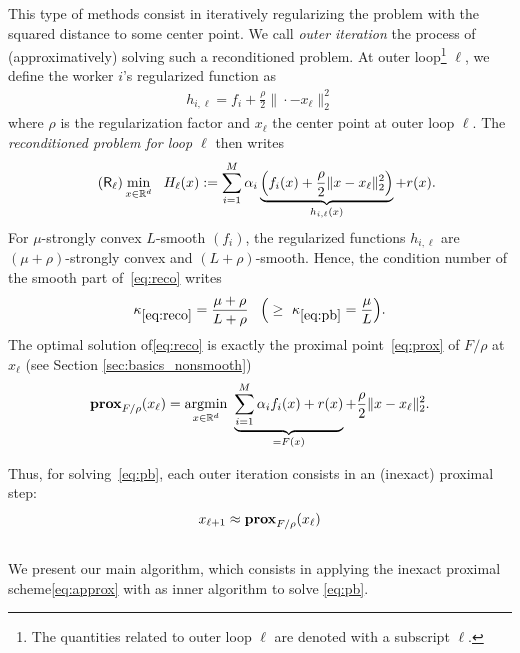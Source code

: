 This type of methods consist in iteratively regularizing the problem with the squared distance to some center point. We call \emph{outer iteration} the process of (approximatively) solving such a reconditioned problem. At outer loop\footnote{The quantities related to outer loop $\ell$ are denoted with a subscript $\ell$.} $\ell$, we define the worker $i$'s regularized function as 
\begin{align*}
    h_{i,\ell} =  f_i + \frac{\rho}{2} \| \cdot - x_\ell \|_2^2 
\end{align*}
where $\rho$ is the regularization factor and $x_\ell$ the center point at outer loop $\ell$. The \emph{reconditioned problem for loop $\ell$} then writes
\begin{align}\label{eq:reco}
\tag{$\mathsf{R}_\ell$}
& \min_{x\in\mathbb{R}^d}  ~~ H_\ell(x)  :=  \sum_{i=1}^M  \alpha_i \underbrace{\left( f_i(x) + \frac{\rho}{2} \| x - x_\ell \|_2^2 \right)}_{h_{i,\ell}(x)}  +  r(x) .
\end{align}
For $\mu$-strongly convex $L$-smooth $(f_i)$, the regularized functions $h_{i,\ell}$ are $(\mu+\rho)$-strongly convex and $(L+\rho)$-smooth. Hence, the condition number of the smooth part of~\eqref{eq:reco} writes
\begin{align*}
   \kappa_{\eqref{eq:reco}} = \frac{\mu + \rho}{L+\rho}\, ~~\Big(\geq~\kappa_{\eqref{eq:pb}} = \frac{\mu}{L}\Big).
\end{align*}
The optimal solution of\;\eqref{eq:reco} is exactly the proximal point~\eqref{eq:prox} of $F/\rho$ at $x_\ell$ (see Section \ref{sec:basics_nonsmooth})
\begin{align*}
\mathbf{prox}_{F/\rho} (x_\ell) = \operatorname*{argmin}_{x\in\mathbb{R}^d}  ~ \underbrace{  \sum_{i=1}^M \alpha_i f_i(x) +  r(x)}_{= F(x)} +  \frac{\rho}{2} \| x- x_\ell \|_2^2.
\end{align*}

Thus, for solving~\eqref{eq:pb}, each outer iteration consists in an (inexact) proximal step:
\begin{align}
\label{eq:approx}
    x_{\ell+1} \approx \mathbf{prox}_{F/\rho} (x_\ell) 
\end{align}

\subsection{\recoalgo}\label{sec:recoalgo}

We present our main algorithm, which consists in applying the inexact proximal scheme\;\eqref{eq:approx} with \salgo as inner algorithm to solve \eqref{eq:pb}. 



